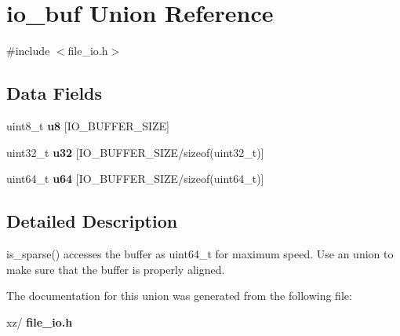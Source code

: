 \section{io\+\_\+buf Union Reference}
\label{unionio__buf}


{\ttfamily \#include $<$file\+\_\+io.\+h$>$}

\subsection*{Data Fields}
\begin{DoxyCompactItemize}
\item 
\mbox{\label{unionio__buf_a8aeb5732cba5cae653b05fb6079850b7}} 
uint8\+\_\+t {\bfseries u8} [I\+O\+\_\+\+B\+U\+F\+F\+E\+R\+\_\+\+S\+I\+ZE]
\item 
\mbox{\label{unionio__buf_a98e0cad575a6118c0518a823e8c0aa1e}} 
uint32\+\_\+t {\bfseries u32} [I\+O\+\_\+\+B\+U\+F\+F\+E\+R\+\_\+\+S\+I\+ZE/sizeof(uint32\+\_\+t)]
\item 
\mbox{\label{unionio__buf_a62b585619d3b3f93e24057fbe1658371}} 
uint64\+\_\+t {\bfseries u64} [I\+O\+\_\+\+B\+U\+F\+F\+E\+R\+\_\+\+S\+I\+ZE/sizeof(uint64\+\_\+t)]
\end{DoxyCompactItemize}


\subsection{Detailed Description}
is\+\_\+sparse() accesses the buffer as uint64\+\_\+t for maximum speed. Use an union to make sure that the buffer is properly aligned. 

The documentation for this union was generated from the following file\+:\begin{DoxyCompactItemize}
\item 
xz/\textbf{ file\+\_\+io.\+h}\end{DoxyCompactItemize}
